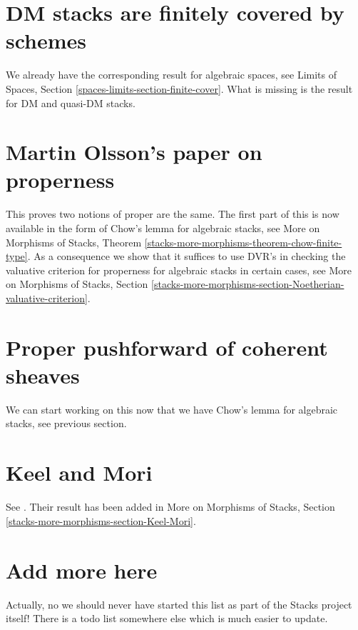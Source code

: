 \section{DM stacks are finitely covered by schemes}
\label{section-dm-finite-cover}

\noindent
We already have the corresponding result for algebraic spaces, see
Limits of Spaces, Section \ref{spaces-limits-section-finite-cover}.
What is missing is the result for DM and quasi-DM stacks.


\section{Martin Olsson's paper on properness}
\label{section-proper-parametrization}

\noindent
This proves two notions of proper are the same. The first part of this
is now available in the form of Chow's lemma for algebraic stacks, see
More on Morphisms of Stacks, Theorem
\ref{stacks-more-morphisms-theorem-chow-finite-type}.
As a consequence we show that it suffices to use DVR's
in checking the valuative criterion for properness for
algebraic stacks in certain cases, see
More on Morphisms of Stacks, Section
\ref{stacks-more-morphisms-section-Noetherian-valuative-criterion}.


\section{Proper pushforward of coherent sheaves}
\label{section-proper-pushforward}

\noindent
We can start working on this now that we have Chow's lemma for
algebraic stacks, see previous section.


\section{Keel and Mori}
\label{section-keel-mori}

\noindent
See \cite{K-M}. Their result has been added in
More on Morphisms of Stacks, Section
\ref{stacks-more-morphisms-section-Keel-Mori}.


\section{Add more here}
\label{section-add-more}

\noindent
Actually, no we should never have started this list as part of
the Stacks project itself! There is a todo list somewhere else
which is much easier to update.









